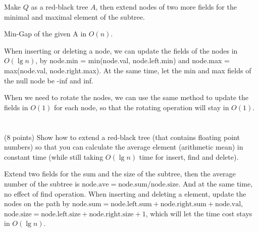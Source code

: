 \documentclass[paper=a4, fontsize=11pt]{scrartcl} %
\begin{document}
Make $Q$ as a red-black tree $A$, then extend nodes of two more fields
for the minimal and maximal element of the subtree.

\begin{algorithm}[H]
  \caption{Min-Gap of the given A in $O(n)$.}
\end{algorithm}

When inserting or deleting a node, we can update the fields of the
nodes in $O(\lg{n})$, by node.min = min(node.val, node.left.min) and
node.max = max(node.val, node.right.max). At the same time, let the
min and max fields of the null node be -inf and inf.

When we need to rotate the nodes, we can use the same method to
update the fields in $O(1)$ for each node, so that the rotating operation
will stay in $O(1)$.


\section{}

\begin{fancyquotes}
  (8 points) Show how to extend a red-black tree (that contains
  floating point numbers) so that you can calculate the average
  element (arithmetic mean) in constant time (while still taking
  $O(\lg{n})$ time for insert, find and delete).
\end{fancyquotes}

Extend two fields for the sum and the size of the subtree, then the
average number of the subtree is $\text{node.ave} = \text{node.sum} /
\text{node.size}$. And at the same time, no effect of find
operation. When inserting and deleting a element, update the nodes on
the path by $\text{node.sum} = \text{node.left.sum} +
\text{node.right.sum} + \text{node.val}$, $\text{node.size} =
\text{node.left.size} + \text{node.right.size} + 1$, which will let
the time cost stays in $O(\lg{n})$.


\end{document}
